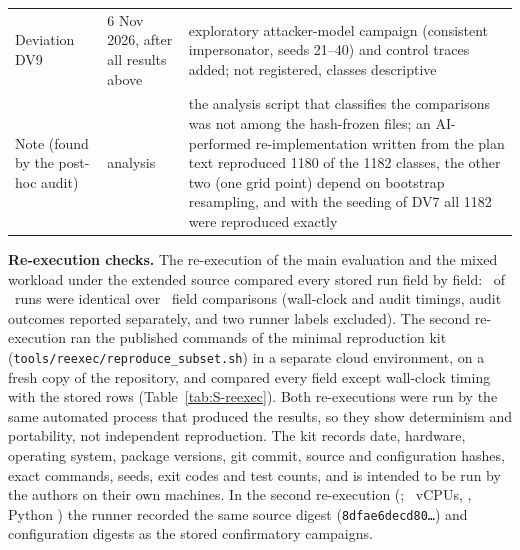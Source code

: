 \documentclass[10pt,a4paper]{article}
\begin{document}
\begin{table}[!htbp]
\begin{tabularx}{\linewidth}{p{3.2cm}p{2.9cm}X}
Deviation DV9 & 6 Nov 2026, after all results above & exploratory attacker-model campaign (consistent impersonator, seeds 21--40) and control traces added; not registered, classes descriptive\\
Note (found by the post-hoc audit) & analysis & the analysis script that classifies the comparisons was not among the hash-frozen files; an AI-performed re-implementation written from the plan text reproduced 1180 of the 1182 classes, the other two (one grid point) depend on bootstrap resampling, and with the seeding of DV7 all 1182 were reproduced exactly\\
\bottomrule
\end{tabularx}
\end{table}

\noindent\textbf{Re-execution checks.} The re-execution of the main evaluation and the mixed workload under the extended source compared every stored run field by field: \WAzeroIdentical\ of \WAzeroCompared\ runs were identical over \WAzeroFieldComparisons\ field comparisons (wall-clock and audit timings, audit outcomes reported separately, and two runner labels excluded). The second re-execution ran the published commands of the minimal reproduction kit (\texttt{tools/\allowbreak{}reexec/\allowbreak{}reproduce\_\allowbreak{}subset.sh}) in a separate cloud environment, on a fresh copy of the repository, and compared every field except wall-clock timing with the stored rows (Table~\ref{tab:S-reexec}). Both re-executions were run by the same automated process that produced the results, so they show determinism and portability, not independent reproduction. The kit records date, hardware, operating system, package versions, git commit, source and configuration hashes, exact commands, seeds, exit codes and test counts, and is intended to be run by the authors on their own machines. In the second re-execution (\XRxDate; \XRxCpus\ vCPUs, \XRxOS, Python \XRxPython) the runner recorded the same source digest (\texttt{8dfae6decd80\ldots}) and configuration digests as the stored confirmatory campaigns.
\begin{table}[!htbp]
\caption{Second-environment re-execution of selected seeds (all fields compared except wall-clock timing: fields containing \texttt{\_\allowbreak{}us}, \texttt{wall\_\allowbreak{}s}, \texttt{audit\_\allowbreak{}static\_\allowbreak{}s}, \texttt{audit\_\allowbreak{}replay\_\allowbreak{}s}).\label{tab:S-reexec}}
\footnotesize\centering

\end{table}
\end{document}
